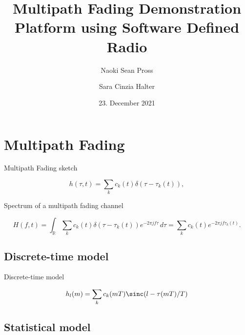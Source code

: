 \documentclass[xetex, onlymath, handout]{beamer}
\title{Multipath Fading Demonstration Platform using Software Defined Radio}
\author{Naoki Sean Pross \and Sara Cinzia Halter}
\date{23. December 2021}
\institute[OST]{OST FHO Campus Rapperswil}
\begin{document}
\frame{
  \maketitle
}

\section{Multipath Fading}

\begin{frame}{Multipath Fading sketch}
	\begin{figure}
		\centering
		
	\end{figure}
	\begin{equation} \label{eqn:multipath-impulse-response}
		h(\tau, t) = \sum_k c_k(t) \delta(\tau - \tau_k(t)),
	\end{equation}
\end{frame}

\begin{frame}{Spectrum of a multipath fading channel}
	\begin{figure}
		\centering
		\resizebox{\linewidth}{!}{
			
		}
	\end{figure}
	\begin{equation} 
		H(f, t) = \int_\mathbb{R} \sum_k c_k(t) \delta(\tau - \tau_k(t)) e^{-2\pi jf\tau} \, d\tau
		= \sum_k c_k(t) e^{-2\pi jf \tau_k(t)}.
	\end{equation}
\end{frame}



\subsection{Discrete-time model}

\begin{frame}{Discrete-time model}
	\begin{figure}
		\centering
		
	\end{figure}
	\begin{equation} 
		h_l(m) = \sum_k c_k(mT) \sinc(l - \tau(mT)/T)
	\end{equation}
\end{frame}


\subsection{Statistical model}
\end{document}
